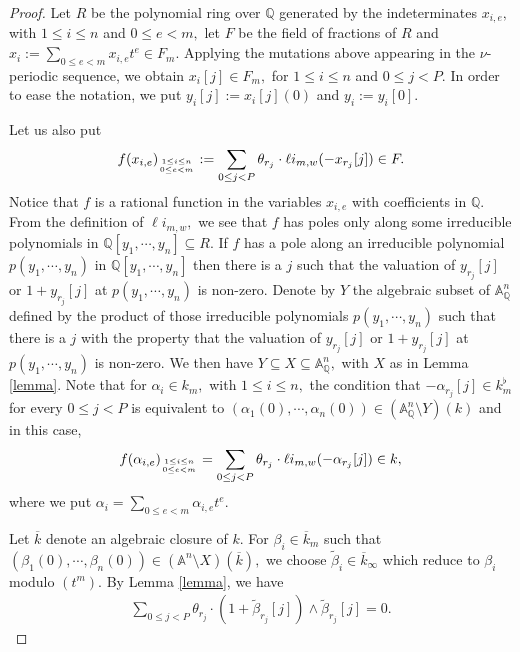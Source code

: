 \documentclass[10pt,a4paper]{amsart}
\begin{document}
\begin{proof}  

Let $R$ be the polynomial ring over  $\mathbb{Q}$ generated by the indeterminates $x _{i,e},$ with $1 \leq i \leq n$ and $0\leq e <m,$ let $F$ be the field of fractions of $R$   and $x_i := \sum _{0 \leq e <m} x _{i,e}t^e \in F_m.$ Applying the mutations above appearing in the $\nu$-periodic sequence, we obtain $x_{i}[j] \in F_{m},$ for $1\leq i\leq n$ and $0\leq j<P.$  In order to ease the notation, we put $y_{i}[j]:=x _{i}[j](0)$ and $y_i:=y_{i}[0].$

Let us also put
$$
f(x_{i,e})_{{1\leq i \leq n} \atop {0\leq e <m}} :=   \sum _{0\leq j <P} \theta_{r_j}\cdot \ell i _{m,w}(-x_{r_j}[j]) \in F.
$$
Notice that $f$ is a rational function in the variables $x_{i,e}$ with coefficients in $\mathbb{Q}.$  From the definition of $\ell i_{m,w},$ we see that $f$  has poles only along some irreducible polynomials in $\mathbb{Q}[y_1,\cdots, y_n] \subseteq R.$ 
If $f$ has a pole along an irreducible polynomial $p(y_1,\cdots,y_n)$ in $\mathbb{Q}[y_1,\cdots, y_n]$ then 
there is a $j$  such that the valuation of $y_{r_j}[j]$ or $1+y_{r_j}[j]$ at $p(y_1,\cdots, y_n)$ is non-zero. Denote by $Y$ the algebraic subset of $\mathbb{A}^{n}_{\mathbb{Q}}$ defined by the product of those irreducible polynomials $p(y_{1},\cdots, y_{n})$  such that there is a $j$  with the property that the valuation of $y_{r_j}[j]$ or $1+y_{r_j}[j]$ at $p(y_1,\cdots, y_n)$ is non-zero. We then  have $Y \subseteq X \subseteq \mathbb{A}^{n} _{\mathbb{Q}},$ with $X$ as in Lemma \ref{lemma}. Note that for $\alpha _{i} \in k_{m},$ with $1 \leq i \leq n,$ the condition that $-\alpha _{r_j}[j] \in k_{m} ^{\flat}$ for every $0\leq j<P$ is equivalent to  $(\alpha_{1}(0), \cdots, \alpha _{n}(0) ) \in (\mathbb{A}^{n}_{\mathbb{Q}} \setminus Y)(k)$ and in this case, 
\begin{align}\label{rational-eqn}
  f(\alpha_{i,e})_{{1\leq i \leq n} \atop {0\leq e <m}} =   \sum _{0\leq j <P} \theta_{r_j}\cdot \ell i _{m,w}(-\alpha_{r_j}[j]) \in k,  
\end{align}
where we put $\alpha_{i}=\sum _{0\leq e<m}\alpha_{i,e}t^e.$



Let $\overline{k}$ denote an algebraic closure of $k.$  For $\beta _{i} \in \overline{k}_m$ such that $(\beta_1(0),\cdots, \beta_{n}(0)) \in (\mathbb{A} ^n \setminus X)(\overline{k}),$ we choose  $\tilde{\beta}_{i} \in \overline{k}_{\infty} $ which reduce to  $\beta _i$ modulo $(t^m).$ By  Lemma \ref{lemma}, we have
\begin{eqnarray}\label{theta-eqn}
  \sum_{0\leq j <P}\theta _{r_{j}}\cdot (1+\tilde{\beta} _{r_j}[j]) \wedge \tilde{\beta} _{r_j}[j]=0.     
\end{eqnarray}


\end{proof}
\end{document}
